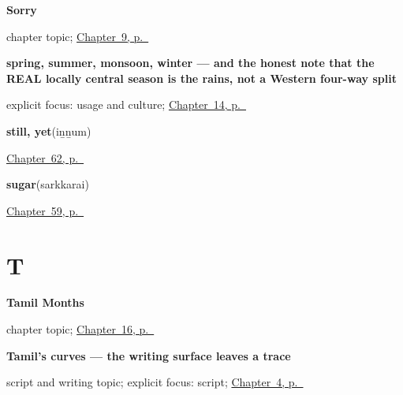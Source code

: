 \noindent\begin{minipage}[t]{\linewidth}
\raggedright
\textbf{Sorry}\par
\footnotesize chapter topic; \hyperref[ch:ta-sorry]{Chapter~9, p.~\pageref*{ch:ta-sorry}}
\end{minipage}\par\smallskip

\noindent\begin{minipage}[t]{\linewidth}
\raggedright
\textbf{spring, summer, monsoon, winter — and the honest note that the REAL locally central season is the rains, not a Western four-way split}\enspace\emph{       }\par
\footnotesize explicit focus: usage and culture; \hyperref[ch:ta-seasons]{Chapter~14, p.~\pageref*{ch:ta-seasons}}
\end{minipage}\par\smallskip

\noindent\begin{minipage}[t]{\linewidth}
\raggedright
\textbf{still, yet}\enspace\emph{}\enspace(iṉṉum)\par
\footnotesize \hyperref[ch:ta-only-and-still]{Chapter~62, p.~\pageref*{ch:ta-only-and-still}}
\end{minipage}\par\smallskip

\noindent\begin{minipage}[t]{\linewidth}
\raggedright
\textbf{sugar}\enspace\emph{}\enspace(sarkkarai)\par
\footnotesize \hyperref[ch:ta-in-the-kitchen]{Chapter~59, p.~\pageref*{ch:ta-in-the-kitchen}}
\end{minipage}\par\smallskip

\section*{T}

\noindent\begin{minipage}[t]{\linewidth}
\raggedright
\textbf{Tamil Months}\par
\footnotesize chapter topic; \hyperref[ch:ta-tamil-months]{Chapter~16, p.~\pageref*{ch:ta-tamil-months}}
\end{minipage}\par\smallskip

\noindent\begin{minipage}[t]{\linewidth}
\raggedright
\textbf{Tamil's curves — the writing surface leaves a trace}\par
\footnotesize script and writing topic; explicit focus: script; \hyperref[ch:farewells]{Chapter~4, p.~\pageref*{ch:farewells}}
\end{minipage}\par\smallskip

